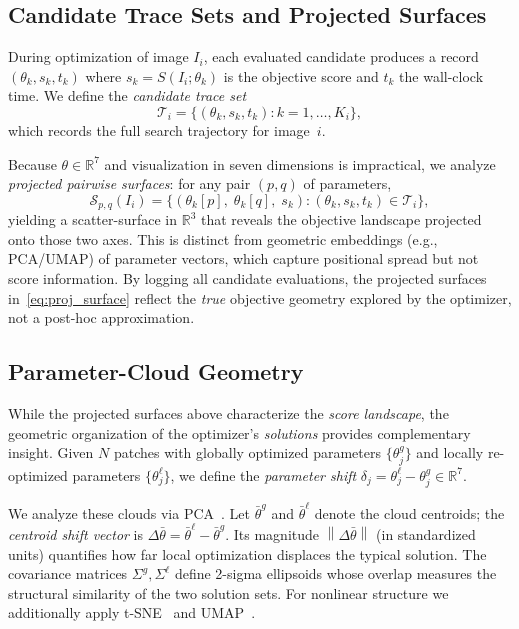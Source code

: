 \documentclass[journal]{IEEEtran}
\newcommand{\R}{\mathbb{R}}
\newcommand{\norm}[1]{\left\lVert #1 \right\rVert}
\begin{document}
\subsection{Candidate Trace Sets and Projected Surfaces}
\label{sec:trace_surfaces}
During optimization of image $I_i$, each evaluated candidate produces a record $({\theta}_k, s_k, t_k)$ where $s_k = S(I_i; {\theta}_k)$ is the objective score and $t_k$ the wall-clock time.
We define the \emph{candidate trace set}
\begin{equation}
\mathcal{T}_i = \bigl\{({\theta}_k, s_k, t_k) : k = 1, \dots, K_i\bigr\},
\label{eq:trace_set}
\end{equation}
which records the full search trajectory for image~$i$.

Because $\theta\in\R^7$ and visualization in seven dimensions is impractical, we analyze \emph{projected pairwise surfaces}: for any pair $(p,q)$ of parameters,
\begin{equation}
\mathcal{S}_{p,q}(I_i) = \bigl\{(\theta_k[p],\; \theta_k[q],\; s_k) : (\theta_k, s_k, t_k) \in \mathcal{T}_i \bigr\},
\label{eq:proj_surface}
\end{equation}
yielding a scatter-surface in $\R^3$ that reveals the objective landscape projected onto those two axes. This is distinct from geometric embeddings (e.g., PCA/UMAP) of parameter vectors, which capture positional spread but not score information. By logging all candidate evaluations, the projected surfaces in~\eqref{eq:proj_surface} reflect the \emph{true} objective geometry explored by the optimizer, not a post-hoc approximation.

\subsection{Parameter-Cloud Geometry}
\label{sec:param_geometry_math}
While the projected surfaces above characterize the \emph{score landscape}, the geometric organization of the optimizer's \emph{solutions} provides complementary insight. Given $N$ patches with globally optimized parameters $\{\theta_j^g\}$ and locally re-optimized parameters $\{\theta_j^\ell\}$, we define the \emph{parameter shift} $\delta_j = \theta_j^\ell - \theta_j^g \in \R^7$.

We analyze these clouds via PCA~\cite{jolliffe2016pca}. Let $\bar\theta^g$ and $\bar\theta^\ell$ denote the cloud centroids; the \emph{centroid shift vector} is $\Delta\bar\theta = \bar\theta^\ell - \bar\theta^g$. Its magnitude $\norm{\Delta\bar\theta}$ (in standardized units) quantifies how far local optimization displaces the typical solution. The covariance matrices $\Sigma^g, \Sigma^\ell$ define 2-sigma ellipsoids whose overlap measures the structural similarity of the two solution sets. For nonlinear structure we additionally apply t-SNE~\cite{vandermaaten2008tsne} and UMAP~\cite{mcinnes2018umap}.
\end{document}
